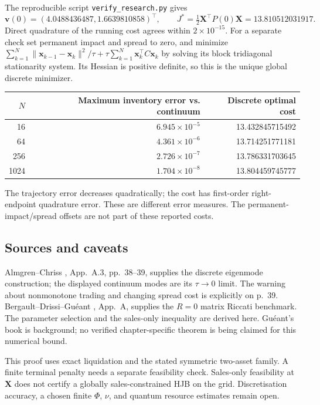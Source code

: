 \documentclass[11pt,a4paper]{article}
\begin{document}
The reproducible script \texttt{verify\_research.py} gives
\[
 \mathbf v(0)=(4.0488436487,1.6639810858)^\top,\qquad
 J^*=\tfrac12\mathbf X^\top P(0)\mathbf X=13.810512031917.
\]
Direct quadrature of the running cost agrees within $2\times10^{-15}$.
For a separate check set permanent impact and spread to zero, and minimize
$\sum_{k=1}^N\|\mathbf x_{k-1}-\mathbf x_k\|^2/\tau
+\tau\sum_{k=1}^N\mathbf x_k^\top C\mathbf x_k$ by solving its block
tridiagonal stationarity system. Its Hessian is positive definite, so this
is the unique global discrete minimizer.
\begin{center}
\begin{tabular}{@{}rrr@{}}
\toprule
$N$ & Maximum inventory error vs. continuum & Discrete optimal cost \\
\midrule
16 & $6.945\times10^{-5}$ & 13.432845715492 \\
64 & $4.361\times10^{-6}$ & 13.714251771181 \\
256 & $2.726\times10^{-7}$ & 13.786331703645 \\
1024 & $1.704\times10^{-8}$ & 13.804459745777 \\
\bottomrule
\end{tabular}
\end{center}
The trajectory error decreases quadratically; the cost has first-order
right-endpoint quadrature error. These are different error measures.
The permanent-impact/spread offsets are not part of these reported costs.

\subsection*{Sources and caveats}

Almgren--Chriss \cite{almgrenchriss2000}, App.~A.3, pp.~38--39, supplies the
discrete eigenmode construction; the displayed continuum modes are its
$\tau\to0$ limit. The warning about nonmonotone trading and changing spread
cost is explicitly on p.~39. Bergault--Drissi--Gu\'eant
\cite{bergault2022}, App.~A, supplies the $R=0$ matrix Riccati benchmark.
The parameter selection and the sales-only inequality are derived here.
Gu\'eant's book is background; no verified chapter-specific theorem is
being claimed for this numerical bound.

This proof uses exact liquidation and the stated symmetric two-asset
family. A finite terminal penalty needs a separate feasibility check.
Sales-only feasibility at $\mathbf X$ does not certify a globally
sales-constrained HJB on the grid. Discretisation accuracy, a chosen finite
$\Phi$, $\nu$, and quantum resource estimates remain open.
\end{document}
